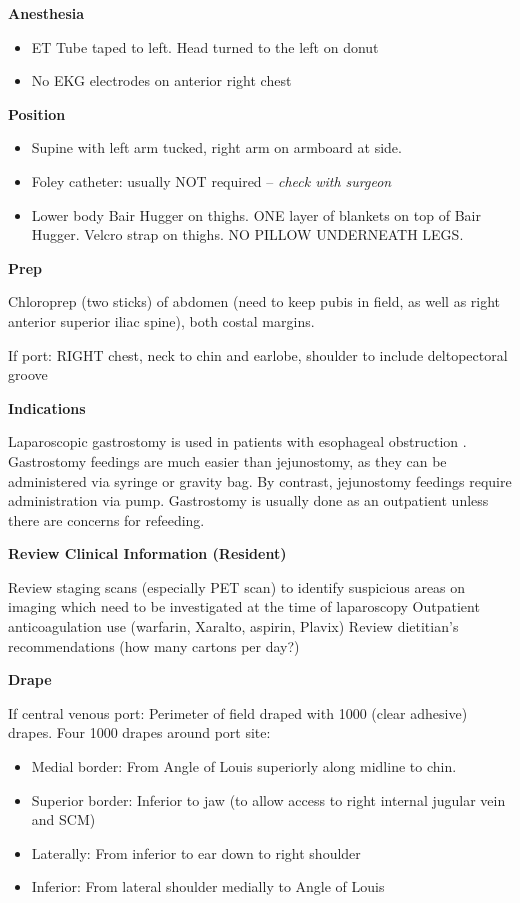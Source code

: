 \documentclass[
  letterpaper,
]{scrbook}
\providecommand{\tightlist}{%
  \setlength{\itemsep}{0pt}\setlength{\parskip}{0pt}}
\begin{document}
\textbf{Anesthesia}

\begin{itemize}
\tightlist
\item
  ET Tube taped to left. Head turned to the left on donut
\item
  No EKG electrodes on anterior right chest
\end{itemize}

\textbf{Position}

\begin{itemize}
\tightlist
\item
  Supine with left arm tucked, right arm on armboard at side.
\item
  Foley catheter: usually NOT required -- \emph{check with surgeon}
\item
  Lower body Bair Hugger on thighs. ONE layer of blankets on top of Bair
  Hugger. Velcro strap on thighs. NO PILLOW UNDERNEATH LEGS.
\end{itemize}

\textbf{Prep}

Chloroprep (two sticks) of abdomen (need to keep pubis in field, as well
as right anterior superior iliac spine), both costal margins.

If port: RIGHT chest, neck to chin and earlobe, shoulder to include
deltopectoral groove

\textbf{Indications}

Laparoscopic gastrostomy is used in patients with esophageal obstruction
. Gastrostomy feedings are much easier than jejunostomy, as they can be
administered via syringe or gravity bag. By contrast, jejunostomy
feedings require administration via pump. Gastrostomy is usually done as
an outpatient unless there are concerns for refeeding.

\textbf{Review Clinical Information (Resident)}

Review staging scans (especially PET scan) to identify suspicious areas
on imaging which need to be investigated at the time of laparoscopy
Outpatient anticoagulation use (warfarin, Xaralto, aspirin, Plavix)
Review dietitian's recommendations (how many cartons per day?)

\textbf{Drape}

If central venous port: Perimeter of field draped with 1000 (clear
adhesive) drapes. Four 1000 drapes around port site:

\begin{itemize}
\tightlist
\item
  Medial border: From Angle of Louis superiorly along midline to chin.
\item
  Superior border: Inferior to jaw (to allow access to right internal
  jugular vein and SCM)
\item
  Laterally: From inferior to ear down to right shoulder
\item
  Inferior: From lateral shoulder medially to Angle of Louis
\end{itemize}
\end{document}
